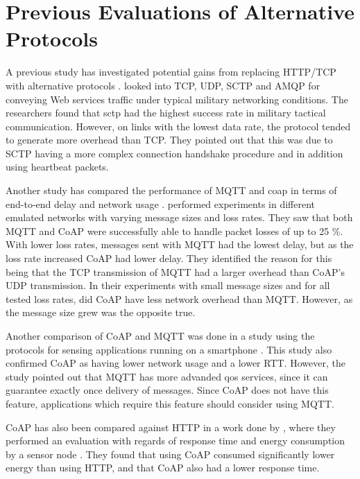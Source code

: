 \section{Previous Evaluations of Alternative Protocols}

A previous study has investigated potential gains from replacing HTTP/TCP with
alternative protocols \cite{evaluation-transport-protocols-web-services}.
 looked into TCP, UDP,
SCTP and AMQP for conveying Web services traffic under typical military
networking conditions. The researchers found that \gls{sctp} had the highest
success rate in military tactical communication. However, on links with the
lowest data rate, the protocol tended to generate more overhead than TCP. They
pointed out that this was due to SCTP having a more complex connection handshake
procedure and in addition using heartbeat packets.

Another study has compared the performance of MQTT and \gls{coap} in terms of
end-to-end delay and network usage \cite{thangavel-mqtt-coap}.
 performed experiments in different emulated
networks with varying message sizes and loss rates. They saw that both MQTT and
CoAP were successfully able to handle packet losses of up to 25 \%. With lower
loss rates, messages sent with MQTT had the lowest delay, but as the loss rate
increased CoAP had lower delay. They identified the reason for this being that
the TCP transmission of MQTT had a larger overhead than CoAP's UDP transmission.
In their experiments with small message sizes and for all tested loss rates, did
CoAP have less network overhead than MQTT. However, as the message size grew was
the opposite true.

Another comparison of CoAP and MQTT was done in a study using the protocols for
sensing applications running on a smartphone \cite{caro-mqtt-coap}. This study
also confirmed CoAP as having lower network usage and a lower RTT. However, the
study pointed out that MQTT has more advanded \gls{qos} services, since it can
guarantee exactly once delivery of messages. Since CoAP does not have this
feature, applications which require this feature should consider using MQTT.

CoAP has also been compared against HTTP in a work done by
\citeauthor{walter-coap-http}, where they performed an evaluation with regards
of response time and energy consumption by a sensor node
\cite{walter-coap-http}. They found that using CoAP consumed significantly lower
energy than using HTTP, and that CoAP also had  a lower response time.


